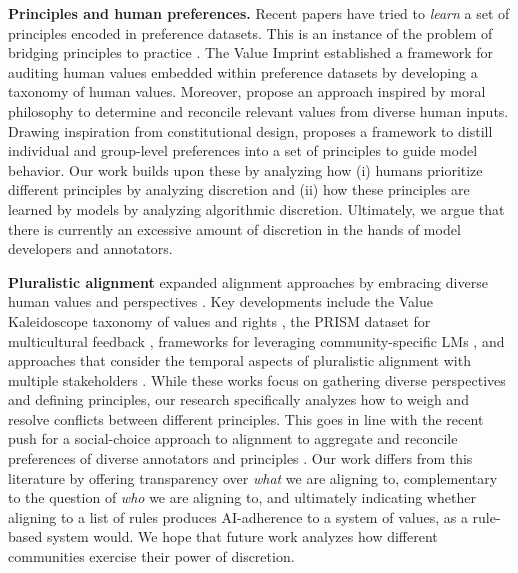 \noindent \textbf{Principles and human preferences.} Recent papers have tried to \textit{learn} a set of principles encoded in preference datasets. This is an instance of the problem of bridging principles to practice \cite{davis2023affordances}. The Value Imprint \cite{obiValueImprintTechnique2024} established a framework for auditing human values embedded within preference datasets by developing a taxonomy of human values. Moreover, \cite{klingefjord2024humanvaluesalignai} propose an approach inspired by moral philosophy to determine and reconcile relevant values from diverse human inputs.  Drawing inspiration from constitutional design, \cite{findeis2024inverse} proposes a framework to distill individual and group-level preferences into a set of principles to guide model behavior. Our work builds upon these by analyzing how (i) humans prioritize different principles by analyzing discretion and (ii) how these principles are learned by models by analyzing algorithmic discretion.
Ultimately, we argue that there is currently an excessive amount of discretion in the hands of model developers and annotators.


\noindent \textbf{Pluralistic alignment} expanded alignment approaches by embracing diverse human values and perspectives \cite{sorensen2024roadmap}. Key developments include the Value Kaleidoscope taxonomy of values and rights \cite{sorensenValueKaleidoscopeEngaging2024}, the PRISM dataset for multicultural feedback \cite{kirkprism}, frameworks for leveraging community-specific LMs \cite{feng2024modular}, and approaches that consider the temporal aspects of pluralistic alignment with multiple stakeholders \cite{klassen2024pluralistic}. While these works focus on gathering diverse perspectives and defining principles, our research specifically analyzes how to weigh and resolve conflicts between different principles. This goes in line with the recent push for a social-choice approach to alignment to aggregate and reconcile preferences of diverse annotators and principles \cite{conitzer2024position}.
Our work differs from this literature by offering transparency over \textit{what} we are aligning to, complementary to the question of \textit{who} we are aligning to, and ultimately indicating whether aligning to a list of rules produces AI-adherence to a system of values, as a rule-based system would. We hope that future work analyzes how different communities exercise their power of discretion.

